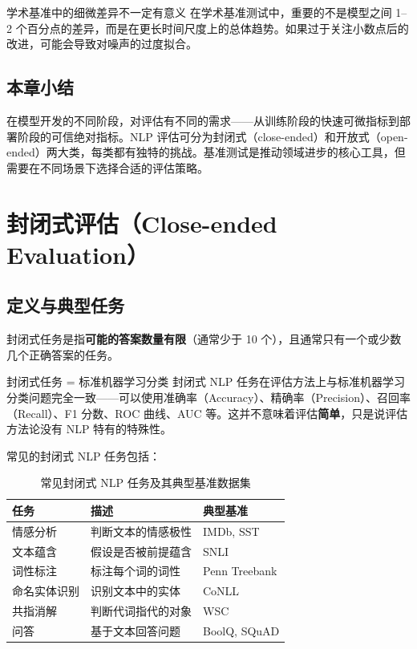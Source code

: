\documentclass[a4paper]{article}
\begin{document}



\begin{warningbox}{学术基准中的细微差异不一定有意义}
在学术基准测试中，重要的不是模型之间 1--2 个百分点的差异，而是在更长时间尺度上的总体趋势。如果过于关注小数点后的改进，可能会导致对噪声的过度拟合。
\end{warningbox}

\subsection{本章小结}

在模型开发的不同阶段，对评估有不同的需求——从训练阶段的快速可微指标到部署阶段的可信绝对指标。NLP 评估可分为封闭式（close-ended）和开放式（open-ended）两大类，每类都有独特的挑战。基准测试是推动领域进步的核心工具，但需要在不同场景下选择合适的评估策略。


\section{封闭式评估（Close-ended Evaluation）}

\subsection{定义与典型任务}

封闭式任务是指\textbf{可能的答案数量有限}（通常少于 10 个），且通常只有一个或少数几个正确答案的任务。





\begin{importantbox}{封闭式任务 = 标准机器学习分类}
封闭式 NLP 任务在评估方法上与标准机器学习分类问题完全一致——可以使用准确率（Accuracy）、精确率（Precision）、召回率（Recall）、F1 分数、ROC 曲线、AUC 等。这并不意味着评估\textbf{简单}，只是说评估方法论没有 NLP 特有的特殊性。
\end{importantbox}

常见的封闭式 NLP 任务包括：

\begin{table}[H]
\centering
\begin{tabular}{lll}
\toprule
\textbf{任务} & \textbf{描述} & \textbf{典型基准} \\
\midrule
情感分析 & 判断文本的情感极性 & IMDb, SST \\
文本蕴含 & 假设是否被前提蕴含 & SNLI \\
词性标注 & 标注每个词的词性 & Penn Treebank \\
命名实体识别 & 识别文本中的实体 & CoNLL \\
共指消解 & 判断代词指代的对象 & WSC \\
问答 & 基于文本回答问题 & BoolQ, SQuAD \\
\bottomrule
\end{tabular}
\caption{常见封闭式 NLP 任务及其典型基准数据集}
\end{table}
\end{document}
